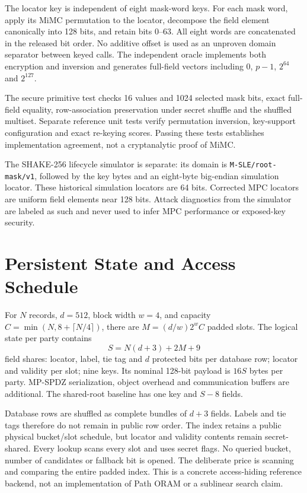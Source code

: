 \documentclass[journal,onecolumn]{IEEEtran}
\begin{document}
The locator key is independent of eight mask-word keys. For each mask word, apply its MiMC permutation to the locator, decompose the field element canonically into 128 bits, and retain bits 0--63. All eight words are concatenated in the released bit order. No additive offset is used as an unproven domain separator between keyed calls. The independent oracle implements both encryption and inversion and generates full-field vectors including $0$, $p-1$, $2^{64}$ and $2^{127}$.

The secure primitive test checks 16 values and 1024 selected mask bits, exact full-field equality, row-association preservation under secret shuffle and the shuffled multiset. Separate reference unit tests verify permutation inversion, key-support configuration and exact re-keying scores. Passing these tests establishes implementation agreement, not a cryptanalytic proof of MiMC.

The SHAKE-256 lifecycle simulator is separate: its domain is \texttt{M-SLE/root-mask/v1}, followed by the key bytes and an eight-byte big-endian simulation locator. These historical simulation locators are 64 bits. Corrected MPC locators are uniform field elements near 128 bits. Attack diagnostics from the simulator are labeled as such and never used to infer MPC performance or exposed-key security.

\section{Persistent State and Access Schedule}
For $N$ records, $d=512$, block width $w=4$, and capacity $C=\min(N,8+\lceil N/4\rceil)$, there are $M=(d/w)2^wC$ padded slots. The logical state per party contains
\[
S=N(d+3)+2M+9
\]
field shares: locator, label, tie tag and $d$ protected bits per database row; locator and validity per slot; nine keys. Its nominal 128-bit payload is $16S$ bytes per party. MP-SPDZ serialization, object overhead and communication buffers are additional. The shared-root baseline has one key and $S-8$ fields.

Database rows are shuffled as complete bundles of $d+3$ fields. Labels and tie tags therefore do not remain in public row order. The index retains a public physical bucket/slot schedule, but locator and validity contents remain secret-shared. Every lookup scans every slot and uses secret flags. No queried bucket, number of candidates or fallback bit is opened. The deliberate price is scanning and comparing the entire padded index. This is a concrete access-hiding reference backend, not an implementation of Path ORAM or a sublinear search claim.
\end{document}
